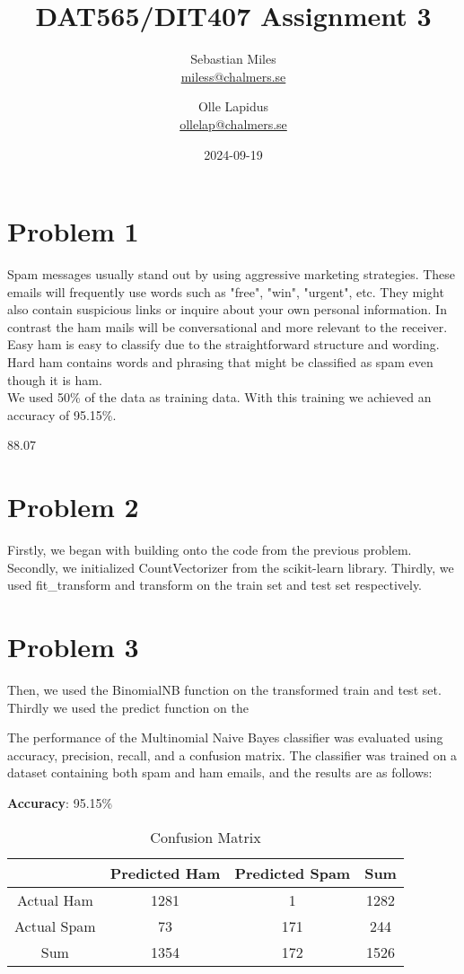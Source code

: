 \documentclass[a4paper]{article}
\begin{document}
\author{
  Sebastian Miles \\
  \href{mailto:miless@chalmers.se}{miless@chalmers.se}
  \and
  Olle Lapidus \\
  \href{mailto:ollelap@chalmers.se}{ollelap@chalmers.se}
}
\title{DAT565/DIT407 Assignment 3}
\date{2024-09-19}

\maketitle
\section*{Problem 1}
Spam messages usually stand out by using aggressive marketing strategies. These emails will frequently use words such as "free", "win", "urgent", etc. They might also contain suspicious links or inquire about your own personal information. In contrast the ham mails will be conversational and more relevant to the receiver. Easy ham is easy to classify due to the straightforward structure and wording. Hard ham contains words and phrasing that might be classified as spam even though it is ham.\\
We used 50\% of the data as training data. With this training we achieved an accuracy of 95.15\%.

88.07


\section*{Problem 2}
Firstly, we began with building onto the code from the previous problem. Secondly, we initialized CountVectorizer from the scikit-learn library. Thirdly, we used fit\_transform and transform on the train set and test set respectively. 

\section*{Problem 3}
Then, we used the BinomialNB function on the transformed train and test set. Thirdly we used the predict function on the 

The performance of the Multinomial Naive Bayes classifier was evaluated using accuracy, precision, recall, and a confusion matrix. The classifier was trained on a dataset containing both spam and ham emails, and the results are as follows:

\textbf{Accuracy}: 95.15\%

\begin{table}[h!]
    \centering
    \begin{tabular}{|c|c|c|c|}
        \hline
        & Predicted Ham & Predicted Spam & Sum \\
        \hline
        Actual Ham & 1281 & 1 & 1282 \\
        \hline
        Actual Spam & 73 & 171 & 244 \\
        \hline
        Sum & 1354 & 172 & 1526 \\
        \hline
    \end{tabular}
    \caption{Confusion Matrix}
\end{table}
\end{document}

